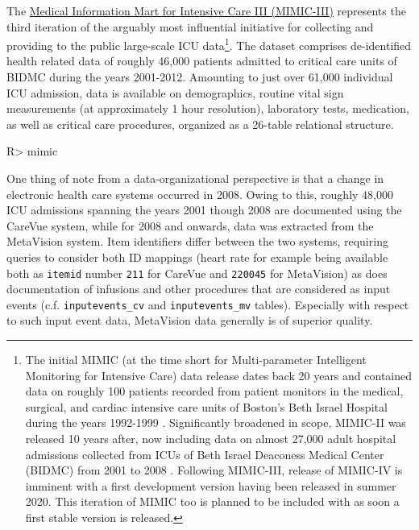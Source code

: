 \documentclass[
  notitle]{jss}
\begin{document}
The \href{https://physionet.org/content/mimiciii/1.4/}{Medical
Information Mart for Intensive Care III (MIMIC-III)} represents the
third iteration of the arguably most influential initiative for
collecting and providing to the public large-scale ICU data\footnote{The
  initial MIMIC (at the time short for Multi-parameter Intelligent
  Monitoring for Intensive Care) data release dates back 20 years and
  contained data on roughly 100 patients recorded from patient monitors
  in the medical, surgical, and cardiac intensive care units of Boston's
  Beth Israel Hospital during the years 1992-1999 \citep{moody1996}.
  Significantly broadened in scope, MIMIC-II was released 10 years
  after, now including data on almost 27,000 adult hospital admissions
  collected from ICUs of Beth Israel Deaconess Medical Center (BIDMC)
  from 2001 to 2008 \citep{lee2011}. Following MIMIC-III, release of
  MIMIC-IV is imminent with a first development version having been
  released in summer 2020. This iteration of MIMIC too is planned to be
  included with  as soon a first stable version is released.}.
The dataset comprises de-identified health related data of roughly
46,000 patients admitted to critical care units of BIDMC during the
years 2001-2012. Amounting to just over 61,000 individual ICU admission,
data is available on demographics, routine vital sign measurements (at
approximately 1 hour resolution), laboratory tests, medication, as well
as critical care procedures, organized as a 26-table relational
structure.

\begin{CodeChunk}
\begin{CodeInput}
R> mimic
\end{CodeInput}
\end{CodeChunk}

One thing of note from a data-organizational perspective is that a
change in electronic health care systems occurred in 2008. Owing to
this, roughly 48,000 ICU admissions spanning the years 2001 though 2008
are documented using the CareVue system, while for 2008 and onwards,
data was extracted from the MetaVision system. Item identifiers differ
between the two systems, requiring queries to consider both ID mappings
(heart rate for example being available both as \texttt{itemid} number
\texttt{211} for CareVue and \texttt{220045} for MetaVision) as does
documentation of infusions and other procedures that are considered as
input events (c.f. \texttt{inputevents\_cv} and \texttt{inputevents\_mv}
tables). Especially with respect to such input event data, MetaVision
data generally is of superior quality.
\end{document}
